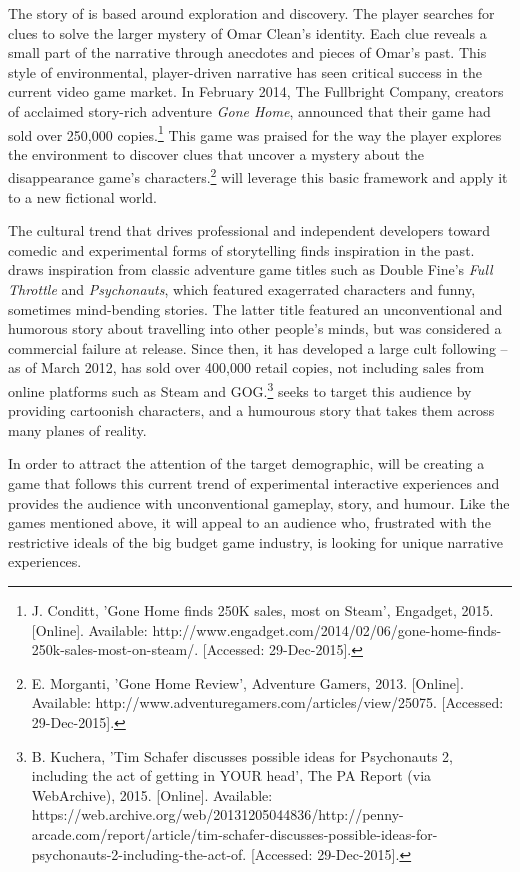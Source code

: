 The story of \ourgame{} is based around exploration and discovery. The player searches for clues to solve the larger mystery of Omar Clean's identity. Each clue reveals a small part of the narrative through anecdotes and pieces of Omar's past. This style of environmental, player-driven narrative has seen critical success in the current video game market. In February 2014, The Fullbright Company, creators of acclaimed story-rich adventure \textit{Gone Home}, announced that their game had sold over 250,000 copies.\footnote{J. Conditt, 'Gone Home finds 250K sales, most on Steam', Engadget, 2015. [Online]. Available: http://www.engadget.com/2014/02/06/gone-home-finds-250k-sales-most-on-steam/. [Accessed: 29-Dec-2015].} This game was praised for the way the player explores the environment to discover clues that uncover a mystery about the disappearance game's characters.\footnote{E. Morganti, 'Gone Home Review', Adventure Gamers, 2013. [Online]. Available: http://www.adventuregamers.com/articles/view/25075. [Accessed: 29-Dec-2015].} \ourgame{} will leverage this basic framework and apply it to a new fictional world.

The cultural trend that drives professional and independent developers toward comedic and experimental forms of storytelling finds inspiration in the past. \ourgame{} draws inspiration from classic adventure game titles such as Double Fine's \textit{Full Throttle} and  \textit{Psychonauts}, which featured exagerrated characters and funny, sometimes mind-bending stories. The latter title featured an unconventional and humorous story about travelling into other people's minds, but was considered a commercial failure at release. Since then, it has developed a large cult following -- as of March 2012, has sold over 400,000 retail copies, not including sales from online platforms such as Steam and GOG.\footnote{B. Kuchera, 'Tim Schafer discusses possible ideas for Psychonauts 2, including the act of getting in YOUR head', The PA Report (via WebArchive), 2015. [Online]. Available: https://web.archive.org/web/20131205044836/http://penny-arcade.com/report/article/tim-schafer-discusses-possible-ideas-for-psychonauts-2-including-the-act-of. [Accessed: 29-Dec-2015].} \ourgame{} seeks to target this audience by providing cartoonish characters, and a humourous story that takes them across many planes of reality.

In order to attract the attention of the target demographic, \ourteam{} will be creating a game that follows this current trend of experimental interactive experiences and provides the audience with unconventional gameplay, story, and humour. Like the games mentioned above, it will appeal to an audience who, frustrated with the restrictive ideals of the big budget game industry, is looking for unique narrative experiences.